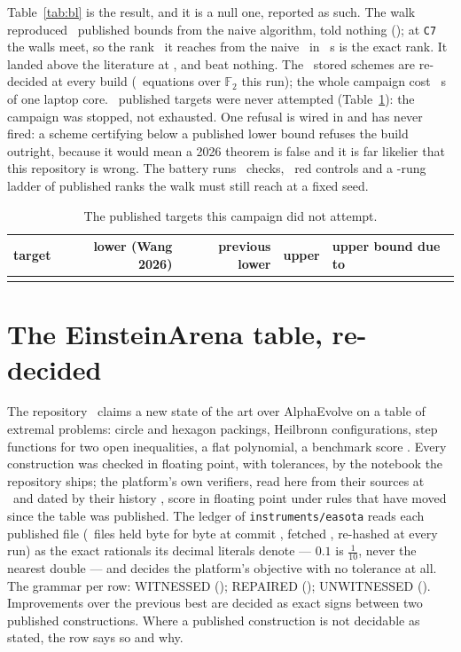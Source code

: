 \documentclass[11pt]{article}
\newcommand{\F}{\mathbb{F}}
\begin{document}
Table~\ref{tab:bl} is the result, and it is a null one, reported as such. The walk reproduced \BLMatch\
published bounds from the naive algorithm, told nothing (\BLMatchList); at \texttt{C7} the walls meet, so
the rank \CSevenRank\ it reaches from the naive \CSevenNaive\ in \CSevenSeconds\ s is the exact rank. It
landed above the literature at \BLAboveList, and beat nothing. The \BLTargets\ stored schemes are re-decided
at every build (\BLEquations\ equations over $\F_2$ this run); the whole campaign cost \BLSeconds\ s of one
laptop core. \BLUntouched\ published targets were never attempted (Table~\ref{tab:bluntouched}): the campaign
was stopped, not exhausted. One refusal is wired in and has never fired: a scheme certifying below a
published lower bound refuses the build outright, because it would mean a 2026 theorem is false and it is
far likelier that this repository is wrong. The battery runs \BLBatteryChecks\ checks, \BLBatteryReds\ red
controls and a \BLBatteryLadder-rung ladder of published ranks the walk must still reach at a fixed seed.

\begin{table}[h]\centering\small
\begin{tabular}{lrrrl}\toprule
target & lower (Wang 2026) & previous lower & upper & upper bound due to \\\midrule
\BLUntouchedRows
\bottomrule\end{tabular}
\caption{The published targets this campaign did not attempt.}\label{tab:bluntouched}
\end{table}

\section{The EinsteinArena table, re-decided}\label{sec:ea}

The repository \EARepo\ claims a new state of the art over AlphaEvolve on a table of extremal problems:
circle and hexagon packings, Heilbronn configurations, step functions for two open inequalities, a flat
polynomial, a benchmark score \cite{EA26}. Every construction was checked in floating point, with
tolerances, by the notebook the repository ships; the platform's own verifiers, read here from their sources
at \EAPlatformHead\ and dated by their history \cite{EAP26}, score in floating point under rules that have
moved since the table was published. The ledger of \texttt{instruments/easota} reads each published
file (\EAFiles\ files held byte for byte at commit \EACommit, fetched \EAFetched, re-hashed at every run) as
the exact rationals its decimal literals denote --- $0.1$ is $\tfrac1{10}$, never the nearest double --- and
decides the platform's objective with no tolerance at all. The grammar per row: WITNESSED (\EAGrammarW);
REPAIRED (\EAGrammarR); UNWITNESSED (\EAGrammarU). Improvements over the previous best are decided as exact
signs between two published constructions. Where a published construction is not decidable as stated, the
row says so and why.
\end{document}
